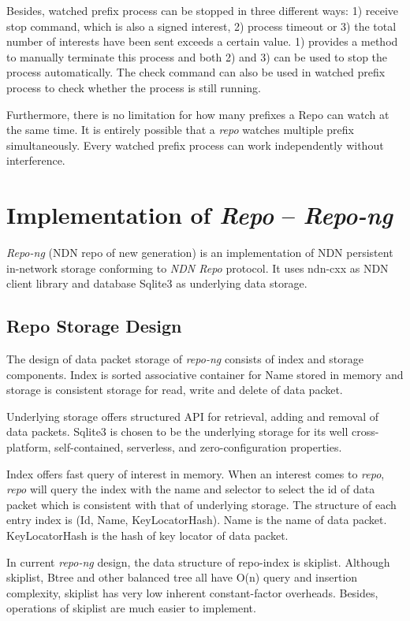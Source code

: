 \documentclass[conference]{IEEEtran}
\begin{document}
Besides, watched prefix process can be stopped in three different ways: 1) receive stop command, which is also a signed interest, 2) process timeout or 3) the total number of interests have been sent exceeds a certain value. 1) provides a method to manually terminate this process and both 2) and 3) can be used to stop the process automatically. The check command can also be used in watched prefix process to check whether the process is still running.

Furthermore, there is no limitation for how many prefixes a Repo can watch at the same time. It is entirely possible that a \emph{repo} watches multiple prefix simultaneously. Every watched prefix process can work independently without interference.

\section{Implementation of \emph{Repo} -- \emph{Repo-ng}} \label{section-implementation}
\emph{Repo-ng} (NDN repo of new generation) is an implementation of NDN persistent in-network storage conforming to \emph{NDN Repo} protocol. It uses ndn-cxx as NDN client library and database Sqlite3 as underlying data storage.

\subsection{Repo Storage Design}

The design of data packet storage of \emph{repo-ng} consists of index and storage components. Index is sorted associative container for Name stored in memory and storage is consistent storage for read, write and delete of data packet.

Underlying storage offers structured API for retrieval, adding and removal of data packets. Sqlite3 is chosen to be the underlying storage for its well cross-platform, self-contained, serverless, and zero-configuration properties.

Index offers fast query of interest in memory. When an interest comes to \emph{repo}, \emph{repo} will query the index with the name and selector to select the id of data packet which is consistent with that of underlying storage. The structure of each entry index is (Id, Name, KeyLocatorHash). Name is the name of data packet. KeyLocatorHash is the hash of key locator of data packet.

In current \emph{repo-ng} design, the data structure of repo-index is skiplist. Although skiplist, Btree and other balanced tree all have O(n) query and insertion complexity, skiplist has very low inherent constant-factor overheads. Besides, operations of skiplist are much easier to implement. \cite{pugh1990skip}
\end{document}
